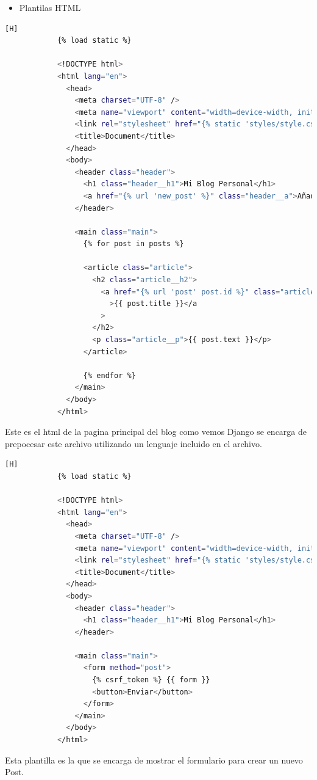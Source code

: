 \documentclass{article}
\begin{document}
        \begin{itemize}	
		\item Plantilas HTML 
	\end{itemize}
	\begin{lstlisting}[language=bash,caption={index.html}][H]
            {% load static %}

            <!DOCTYPE html>
            <html lang="en">
              <head>
                <meta charset="UTF-8" />
                <meta name="viewport" content="width=device-width, initial-scale=1.0" />
                <link rel="stylesheet" href="{% static 'styles/style.css' %}" />
                <title>Document</title>
              </head>
              <body>
                <header class="header">
                  <h1 class="header__h1">Mi Blog Personal</h1>
                  <a href="{% url 'new_post' %}" class="header__a">Añadir</a>
                </header>
            
                <main class="main">
                  {% for post in posts %}
            
                  <article class="article">
                    <h2 class="article__h2">
                      <a href="{% url 'post' post.id %}" class="article__a"
                        >{{ post.title }}</a
                      >
                    </h2>
                    <p class="article__p">{{ post.text }}</p>
                  </article>
            
                  {% endfor %}
                </main>
              </body>
            </html>
	\end{lstlisting}
        Este es el html de la pagina principal del blog como vemos Django se encarga de prepocesar este archivo utilizando un lenguaje incluido en el archivo.

        \begin{lstlisting}[language=bash,caption={newPost.html}][H]
            {% load static %}

            <!DOCTYPE html>
            <html lang="en">
              <head>
                <meta charset="UTF-8" />
                <meta name="viewport" content="width=device-width, initial-scale=1.0" />
                <link rel="stylesheet" href="{% static 'styles/style.css' %}" />
                <title>Document</title>
              </head>
              <body>
                <header class="header">
                  <h1 class="header__h1">Mi Blog Personal</h1>
                </header>
            
                <main class="main">
                  <form method="post">
                    {% csrf_token %} {{ form }}
                    <button>Enviar</button>
                  </form>
                </main>
              </body>
            </html>
	\end{lstlisting}
        Esta plantilla es la que se encarga de mostrar el formulario para crear un nuevo Post.
\end{document}
